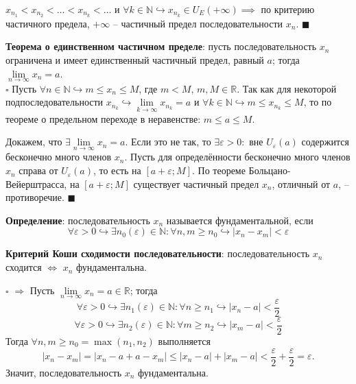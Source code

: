 \documentclass[12pt, a4paper, reqno]{article}
\begin{document}
    $x_{n_1} < x_{n_2} < \ldots < x_{n_k} < \ldots$ и $\forall k\in\mathbb{N} \hookrightarrow
    x_{n_k}\in U_{E}(+\infty) \implies$ по критерию частичного предела, $+\infty$ -- частичный предел
    последовательности $x_n$. $\blacksquare$

    \textbf{Теорема о единственном частичном пределе}: пусть последовательность $x_n$ ограничена и
    имеет единственный частичный предел, равный $a$; тогда $\lim\limits_{n\to\infty} x_n = a$.\\
    $\square$ Пусть $\forall n\in\mathbb{N} \hookrightarrow m \leq x_n \leq M$, где $m < M$,
    $m, M\in\mathbb{R}$. Так как для некоторой подпоследовательности
    $x_{n_k} \hookrightarrow \lim\limits_{k\to\infty} x_{n_k} = a$ и
    $\forall k \in \mathbb{N} \hookrightarrow m \leq x_{n_k} \leq M$, то по теореме о предельном
    переходе в неравенстве: $m \leq a \leq M$.

    Докажем, что $\exists\lim\limits_{n\to\infty} x_n = a$. Если это не так, то
    $\exists\varepsilon > 0:$ вне $U_{\varepsilon}(a)$ содержится бесконечно много членов $x_n$.
    Пусть для определённости бесконечно много членов $x_n$ справа от $U_{\varepsilon}(a)$, то есть
    на $[a + \varepsilon; M]$. По теореме Больцано-Вейерштрасса, на $[a + \varepsilon; M]$
    существует частичный предел $x_n$, отличный от $a$, -- противоречие. $\blacksquare$

    \textbf{Определение}: последовательность $x_n$ называется фундаментальной, если
    \begin{equation*}
        \forall\varepsilon > 0 \hookrightarrow \exists n_0(\varepsilon)\in\mathbb{N}: \forall n, m
        \geq n_0 \hookrightarrow |x_n - x_m| < \varepsilon
    \end{equation*}

    \textbf{Критерий Коши сходимости последовательности}: последовательность $x_n$ сходится $\iff$
    $x_n$ фундаментальна.

    $\square$ $\boxed{\Rightarrow}$ Пусть $\lim\limits_{n\to\infty} x_n = a\in\mathbb{R}$; тогда
    \begin{equation*}
        \forall\varepsilon > 0 \hookrightarrow \exists n_1(\varepsilon)\in\mathbb{N}: \forall n \geq
        n_1 \hookrightarrow |x_n - a| < \dfrac{\varepsilon}{2}
    \end{equation*}
    \begin{equation*}
        \forall\varepsilon > 0 \hookrightarrow \exists n_2(\varepsilon)\in\mathbb{N}: \forall m \geq
        n_2 \hookrightarrow |x_m - a| < \dfrac{\varepsilon}{2}
    \end{equation*}
    Тогда $\forall n, m \geq n_0 = \max(n_1, n_2)$ выполняется
    \begin{equation*}
        |x_n - x_m| = |x_n - a + a - x_m| \leq |x_n - a| + |x_m - a| < \dfrac{\varepsilon}{2} +
        \dfrac{\varepsilon}{2} = \varepsilon.
    \end{equation*}
    Значит, последовательность $x_n$ фундаментальна.
\end{document}
